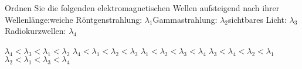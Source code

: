 \documentclass[11pt]{exam}
\begin{document}
\begin{questions}
\vspace{3mm}\question Ordnen Sie die folgenden elektromagnetischen Wellen aufsteigend nach ihrer Wellenlänge:weiche Röntgenstrahlung: \( \lambda_1 \)Gammastrahlung: \( \lambda_2 \)sichtbares Licht: \( \lambda_3 \)Radiokurzwellen: \( \lambda_4 \)

\begin{choices}
	\choice \( \lambda_4 < \lambda_3 < \lambda_1 < \lambda_2 \)
	\choice \( \lambda_4 < \lambda_1 < \lambda_2 < \lambda_3 \)
	\choice \( \lambda_1 < \lambda_2 < \lambda_3 < \lambda_4 \)
	\choice \( \lambda_3 < \lambda_4 < \lambda_2 < \lambda_1 \)
	\choice \( \lambda_2 < \lambda_1 < \lambda_3 < \lambda_4 \)
\end{choices}

\vspace{3mm}\end{questions}
\end{document}
